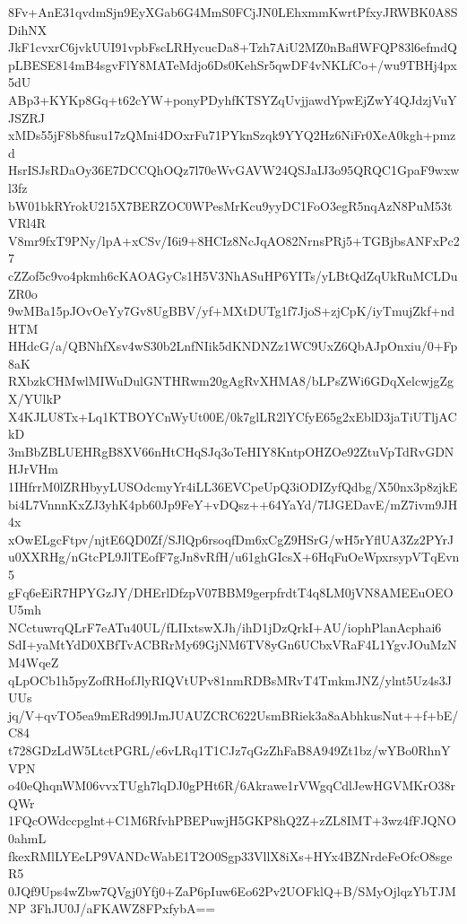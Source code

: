 8Fv+AnE31qvdmSjn9EyXGab6G4MmS0FCjJN0LEhxmmKwrtPfxyJRWBK0A8SDihNX
JkF1cvxrC6jvkUUI91vpbFscLRHycucDa8+Tzh7AiU2MZ0nBaflWFQP83l6efmdQ
pLBESE814mB4sgvFlY8MATeMdjo6Ds0KehSr5qwDF4vNKLfCo+/wu9TBHj4px5dU
ABp3+KYKp8Gq+t62cYW+ponyPDyhfKTSYZqUvjjawdYpwEjZwY4QJdzjVuYJSZRJ
xMDs55jF8b8fusu17zQMni4DOxrFu71PYknSzqk9YYQ2Hz6NiFr0XeA0kgh+pmzd
HsrISJsRDaOy36E7DCCQhOQz7l70eWvGAVW24QSJaIJ3o95QRQC1GpaF9wxwl3fz
bW01bkRYrokU215X7BERZOC0WPesMrKcu9yyDC1FoO3egR5nqAzN8PuM53tVRl4R
V8mr9fxT9PNy/lpA+xCSv/I6i9+8HCIz8NcJqAO82NrnsPRj5+TGBjbsANFxPc27
cZZof5c9vo4pkmh6cKAOAGyCs1H5V3NhASuHP6YITs/yLBtQdZqUkRuMCLDuZR0o
9wMBa15pJOvOeYy7Gv8UgBBV/yf+MXtDUTg1f7JjoS+zjCpK/iyTmujZkf+ndHTM
HHdcG/a/QBNhfXsv4wS30b2LnfNIik5dKNDNZz1WC9UxZ6QbAJpOnxiu/0+Fp8aK
RXbzkCHMwlMIWuDulGNTHRwm20gAgRvXHMA8/bLPsZWi6GDqXelcwjgZgX/YUlkP
X4KJLU8Tx+Lq1KTBOYCnWyUt00E/0k7glLR2lYCfyE65g2xEblD3jaTiUTljACkD
3mBbZBLUEHRgB8XV66nHtCHqSJq3oTeHIY8KntpOHZOe92ZtuVpTdRvGDNHJrVHm
1IHfrrM0lZRHbyyLUSOdcmyYr4iLL36EVCpeUpQ3iODIZyfQdbg/X50nx3p8zjkE
bi4L7VnnnKxZJ3yhK4pb60Jp9FeY+vDQsz++64YaYd/7IJGEDavE/mZ7ivm9JH4x
xOwELgcFtpv/njtE6QD0Zf/SJlQp6rsoqfDm6xCgZ9HSrG/wH5rYflUA3Zz2PYrJ
u0XXRHg/nGtcPL9JlTEofF7gJn8vRfH/u61ghGIcsX+6HqFuOeWpxrsypVTqEvn5
gFq6eEiR7HPYGzJY/DHErlDfzpV07BBM9gerpfrdtT4q8LM0jVN8AMEEuOEOU5mh
NCctuwrqQLrF7eATu40UL/fLIIxtswXJh/ihD1jDzQrkI+AU/iophPlanAcphai6
SdI+yaMtYdD0XBfTvACBRrMy69GjNM6TV8yGn6UCbxVRaF4L1YgvJOuMzNM4WqeZ
qLpOCb1h5pyZofRHofJlyRIQVtUPv81nmRDBsMRvT4TmkmJNZ/ylnt5Uz4s3JUUs
jq/V+qvTO5ea9mERd99lJmJUAUZCRC622UsmBRiek3a8aAbhkusNut++f+bE/C84
t728GDzLdW5LtctPGRL/e6vLRq1T1CJz7qGzZhFaB8A949Zt1bz/wYBo0RhnYVPN
o40eQhqnWM06vvxTUgh7lqDJ0gPHt6R/6Akrawe1rVWgqCdlJewHGVMKrO38rQWr
1FQcOWdccpglnt+C1M6RfvhPBEPuwjH5GKP8hQ2Z+zZL8IMT+3wz4fFJQNO0ahmL
fkexRMlLYEeLP9VANDcWabE1T2O0Sgp33VllX8iXs+HYx4BZNrdeFeOfcO8sgeR5
0JQf9Ups4wZbw7QVgj0Yfj0+ZaP6pIuw6Eo62Pv2UOFklQ+B/SMyOjlqzYbTJMNP
3FhJU0J/aFKAWZ8FPxfybA==
